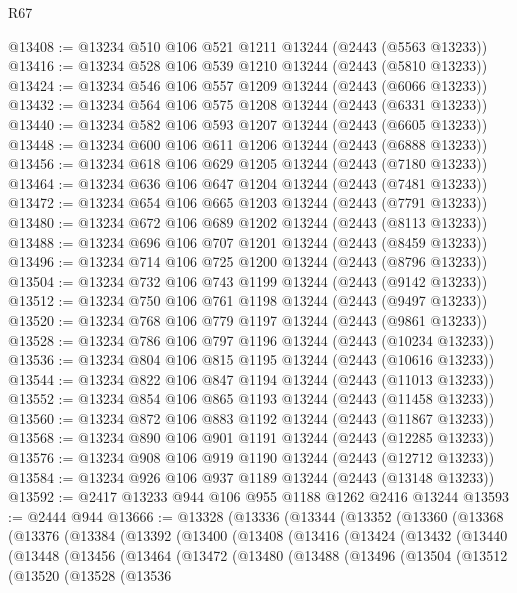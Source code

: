 \begin{lexlean}{R67}
\begin{coremodule}
@13408 := @13234 @510 @106 @521 @1211 @13244 (@2443 (@5563 @13233))
@13416 := @13234 @528 @106 @539 @1210 @13244 (@2443 (@5810 @13233))
@13424 := @13234 @546 @106 @557 @1209 @13244 (@2443 (@6066 @13233))
@13432 := @13234 @564 @106 @575 @1208 @13244 (@2443 (@6331 @13233))
@13440 := @13234 @582 @106 @593 @1207 @13244 (@2443 (@6605 @13233))
@13448 := @13234 @600 @106 @611 @1206 @13244 (@2443 (@6888 @13233))
@13456 := @13234 @618 @106 @629 @1205 @13244 (@2443 (@7180 @13233))
@13464 := @13234 @636 @106 @647 @1204 @13244 (@2443 (@7481 @13233))
@13472 := @13234 @654 @106 @665 @1203 @13244 (@2443 (@7791 @13233))
@13480 := @13234 @672 @106 @689 @1202 @13244 (@2443 (@8113 @13233))
@13488 := @13234 @696 @106 @707 @1201 @13244 (@2443 (@8459 @13233))
@13496 := @13234 @714 @106 @725 @1200 @13244 (@2443 (@8796 @13233))
@13504 := @13234 @732 @106 @743 @1199 @13244 (@2443 (@9142 @13233))
@13512 := @13234 @750 @106 @761 @1198 @13244 (@2443 (@9497 @13233))
@13520 := @13234 @768 @106 @779 @1197 @13244 (@2443 (@9861 @13233))
@13528 := @13234 @786 @106 @797 @1196 @13244 (@2443 (@10234 @13233))
@13536 := @13234 @804 @106 @815 @1195 @13244 (@2443 (@10616 @13233))
@13544 := @13234 @822 @106 @847 @1194 @13244 (@2443 (@11013 @13233))
@13552 := @13234 @854 @106 @865 @1193 @13244 (@2443 (@11458 @13233))
@13560 := @13234 @872 @106 @883 @1192 @13244 (@2443 (@11867 @13233))
@13568 := @13234 @890 @106 @901 @1191 @13244 (@2443 (@12285 @13233))
@13576 := @13234 @908 @106 @919 @1190 @13244 (@2443 (@12712 @13233))
@13584 := @13234 @926 @106 @937 @1189 @13244 (@2443 (@13148 @13233))
@13592 := @2417 @13233 @944 @106 @955 @1188 @1262 @2416 @13244
@13593 := @2444 @944
@13666 := @13328
    (@13336
      (@13344
        (@13352
          (@13360
            (@13368
              (@13376
                (@13384
                  (@13392
                    (@13400
                      (@13408
                        (@13416
                          (@13424
                            (@13432
                              (@13440
                                (@13448
                                  (@13456
                                    (@13464
                                      (@13472
                                        (@13480
                                          (@13488
                                            (@13496
                                              (@13504
                                                (@13512
                                                  (@13520
                                                    (@13528
                                                      (@13536

\end{coremodule}
\end{lexlean}
